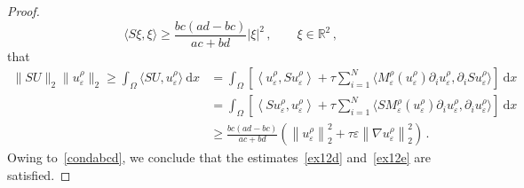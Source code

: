 \documentclass[10pt]{amsart}
\theoremstyle{definition}\newtheorem{defi}[theo]{Definition}\newtheorem{rema}[theo]{Remark}\newtheorem{exam}[theo]{Example}\newtheorem{exem}[theo]{Example}\newtheorem{nota}[theo]{Notation}
\newcommand{\bbR}{\mathbb{R}}
\newcommand{\rmd}{\mathrm{d}}
\begin{document}
\begin{proof}
\begin{equation*}
\langle S\xi,\xi\rangle \ge \frac{bc(ad-bc)}{ac+bd} |\xi|^2\,, \qquad \xi\in\bbR^2\,,
\end{equation*}
that
\begin{align*}
\|SU\|_2 \|u_\varepsilon^\rho\|_2 \ge \int_\Omega \langle SU, u_\varepsilon^\rho \rangle\ \rmd x & = \int_\Omega \left[\left\langle u_\varepsilon^\rho, S u_\varepsilon^\rho \right\rangle + \tau \sum_{i=1}^N\big\langle M_\varepsilon^\rho\left(u_\varepsilon^\rho\right) \partial_i u_\varepsilon^\rho, \partial_i S u_\varepsilon^\rho \big\rangle \right]\ \rmd x \\
& = \int_\Omega \left[\left\langle Su_\varepsilon^\rho, u_\varepsilon^\rho \right\rangle + \tau \sum_{i=1}^N\big\langle S M_\varepsilon^\rho\left(u_\varepsilon^\rho\right) \partial_i u_\varepsilon^\rho, \partial_i u_\varepsilon^\rho \big\rangle \right]\ \rmd x \\
& \ge \frac{bc(ad-bc)}{ac+bd} \left(\left\|u_\varepsilon^\rho\right\|_2^2 + \tau \varepsilon \left\|\nabla u_\varepsilon^\rho\right\|_2^2 \right)\,.
\end{align*}
Owing to~\eqref{condabcd}, we conclude that the estimates~\eqref{ex12d} and~\eqref{ex12e} are satisfied.


\end{proof}
\end{document}
